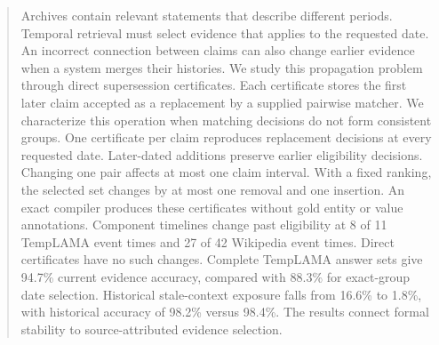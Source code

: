 \begin{abstract}
Archives contain relevant statements that describe different periods.
Temporal retrieval must select evidence that applies to the requested date.
An incorrect connection between claims can also change earlier evidence when a system merges their histories.
We study this propagation problem through direct supersession certificates.
Each certificate stores the first later claim accepted as a replacement by a supplied pairwise matcher.
We characterize this operation when matching decisions do not form consistent groups.
One certificate per claim reproduces replacement decisions at every requested date.
Later-dated additions preserve earlier eligibility decisions.
Changing one pair affects at most one claim interval.
With a fixed ranking, the selected set changes by at most one removal and one insertion.
An exact compiler produces these certificates without gold entity or value annotations.
Component timelines change past eligibility at 8 of 11 TempLAMA event times and 27 of 42 Wikipedia event times.
Direct certificates have no such changes.
Complete TempLAMA answer sets give 94.7\% current evidence accuracy, compared with 88.3\% for exact-group date selection.
Historical stale-context exposure falls from 16.6\% to 1.8\%, with historical accuracy of 98.2\% versus 98.4\%.
The results connect formal stability to source-attributed evidence selection.
\end{abstract}
